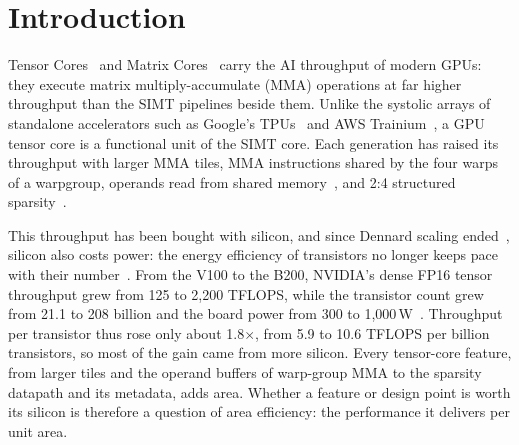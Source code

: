 \section{Introduction}
\label{sec:intro}
\begingroup\renewcommand{\thefootnote}{}\endgroup

Tensor Cores~\cite{nvidia2017volta, nvidia2020ampere, nvidia2022hopper, nvidia2024blackwell} and Matrix Cores~\cite{amd2020cdna1, amd2021cdna2, amd2023cdna3, amd2025cdna4} carry the AI throughput of modern GPUs: they execute matrix multiply-accumulate (MMA) operations at far higher throughput than the SIMT pipelines beside them. Unlike the systolic arrays of standalone accelerators such as Google's TPUs~\cite{jouppi2017indatacenterperformanceanalysistensor, jouppi2020domain, norrie2021design, jouppi2021ten, jouppi2023tpuv4} and AWS Trainium~\cite{aws_trainium_architecture}, a GPU tensor core is a functional unit of the SIMT core. Each generation has raised its throughput with larger MMA tiles, MMA instructions shared by the four warps of a warpgroup, operands read from shared memory~\cite{luo2025dissectingnvidiahopperarchitecture}, and 2:4 structured sparsity~\cite{nvidia2020ampere, mishra2021acceleratingsparsedeepneural}.

This throughput has been bought with silicon, and since Dennard scaling ended~\cite{hennessy2019golden}, silicon also costs power: the energy efficiency of transistors no longer keeps pace with their number~\cite{esmaeilzadeh2011dark}. From the V100 to the B200, NVIDIA's dense FP16 tensor throughput grew from 125 to 2,200 TFLOPS, while the transistor count grew from 21.1 to 208 billion and the board power from 300 to 1,000\,W~\cite{nvidia2017volta, nvidia2024blackwell}. Throughput per transistor thus rose only about 1.8$\times$, from 5.9 to 10.6 TFLOPS per billion transistors, so most of the gain came from more silicon. Every tensor-core feature, from larger tiles and the operand buffers of warp-group MMA to the sparsity datapath and its metadata, adds area. Whether a feature or design point is worth its silicon is therefore a question of area efficiency: the performance it delivers per unit area.

